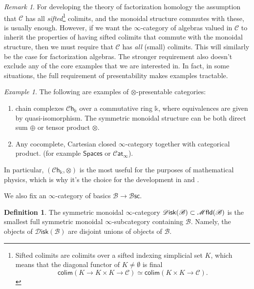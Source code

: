 \documentclass[12pt,a4paper]{article}
\newcounter{counter} \numberwithin{counter}{section}
\theoremstyle{definition}
\newtheorem{definition}[counter]{Definition}
\theoremstyle{plain}
\theoremstyle{remark}
\newtheorem{example}[counter]{Example}
\newtheorem{remark}[counter]{Remark}
\newcommand{\catC}{\mathscr{C}}
\newcommand{\mfld}[1][s]{%
    \ifx r#1\mathsf{Mfld}\else
    \ifx s#1\mathscr{M} \mathsf{fld}\else
    \mathrm{Illegal~option}%
    \fi\fi
}
\newcommand{\disk}{\mathscr{D} \mathsf{isk}}
\newcommand{\cat}{\mathscr{C} \mathsf{at}_{\infty}}
\newcommand{\bsc}{\mathscr{B} \mathsf{sc}}
\newcommand{\bstr}{\mathscr{B}}
\begin{document}
\begin{remark}
    For developing the theory of factorization homology the assumption that $\catC$ has all \emph{sifted}\footnote{Sifted colimits are colimits over a sifted indexing simplicial set $K$, which means that the diagonal functor of $K \neq \emptyset$ is final \[ \mathsf{colim}(K \rightarrow K \times K \rightarrow \catC) \simeq \mathsf{colim}(K \times K \rightarrow \catC).\]} colimits, and the monoidal structure commutes with these, is usually enough. However, if we want the $\infty$-category of algebras valued in $\catC$ to inherit the properties of having sifted colimits that commute with the monoidal structure, then we must require that $\catC$ has \emph{all} (small) colimits. This will similarly be the case for factorization algebras. The stronger requirement also doesn't exclude any of the core examples that we are interested in. In fact, in some situations, the full requirement of presentability makes examples tractable.
\end{remark}

\begin{example}
    The following are examples of $\otimes$-presentable categories:
    \begin{enumerate}
        \item chain complexes $\mathscr{C}\mathsf{h}_{\mathbb{k}}$ over a commutative ring $\mathbb{k}$, where equivalences are given by quasi-isomorphism. The symmetric monoidal structure can be both direct sum $\oplus$ or tensor product $\otimes$.
        \item Any cocomplete, Cartesian closed $\infty$-category together with categorical product. (for example $\mathsf{Spaces}$ or $\cat$).
    \end{enumerate}
    In particular, $(\mathscr{C}\mathsf{h}_{\mathbb{k}}, \otimes)$ is the most useful for the purposes of mathematical physics, which is why it's the choice for the development in \cite{cg2016} and \cite{ginot2015}.
\end{example}

We also fix an $\infty$-category of basics $\bstr \rightarrow \bsc$.

\begin{definition}
    The symmetric monoidal $\infty$-category $\disk(\bstr) \subset \mfld(\bstr)$ is the smallest full symmetric monoidal $\infty$-subcategory containing $\bstr$. Namely, the objects of $\disk(\bstr)$ are disjoint unions of objects of $\bstr$.
\end{definition}
\end{document}
